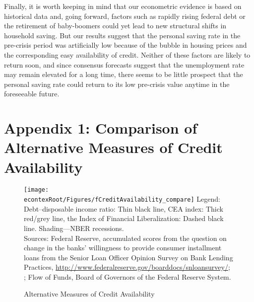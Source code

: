 \documentclass[titlepage]{\econtex}
\begin{document}
Finally, it is worth keeping in mind that our econometric evidence is based on historical data and, going
forward, factors such as rapidly rising federal debt or the retirement
of baby-boomers could yet lead to new structural shifts in household
saving. But our results suggest that the personal saving rate in the
pre-crisis period was artificially low because of the bubble in
housing prices and the corresponding easy availability of credit.
Neither of these factors are likely to return soon, and since
consensus forecasts suggest that the unemployment rate may
remain elevated for a long time, there seems to be little prospect
that the personal saving rate could return to its low pre-crisis value
anytime in the foreseeable future.




\small

%



\clearpage
\section*{Appendix 1: Comparison of Alternative Measures of Credit Availability}


\begin{figure}
\caption{Alternative Measures of Credit Availability \label{fCreditAvailability}}
\texttt{[image: \\econtexRoot/Figures/fCreditAvailability\_compare]}
\footnotesize
Legend: Debt--disposable income ratio: Thin black line, CEA index: Thick red/grey line, the \cite{abiadEtAl_FinReforms} Index of Financial Liberalization: Dashed black line. Shading---NBER recessions.\\[0mm]
\tiny Sources: Federal Reserve, accumulated scores from the question on change in the banks' willingness to provide consumer installment loans from the Senior Loan Officer Opinion Survey on Bank Lending Practices, \url{http://www.federalreserve.gov/boarddocs/snloansurvey/}; \cite{abiadEtAl_FinReforms}; Flow of Funds, Board of Governors of the Federal Reserve System.
\end{figure}
\end{document}
